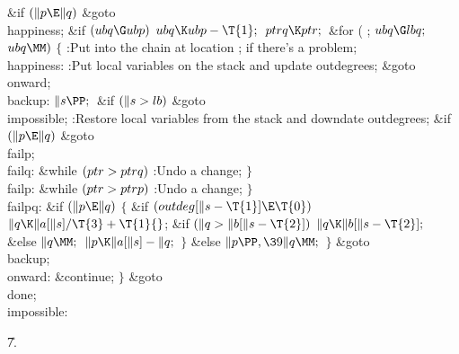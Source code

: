 \&{if} ${}(\|p\E\|q){}$\1\5
\&{goto} \\{happiness};\2\6
\&{if} ${}(\\{ubq}\G\\{ubp}){}$\1\5
${}\\{ubq}\K\\{ubp}-\T{1};{}$\2\6
${}\\{ptrq}\K\\{ptr};{}$\6
\&{for} ( ; ${}\\{ubq}\G\\{lbq};{}$ ${}\\{ubq}\MM){}$\5
${}\{{}$\1\6
:Put  into the chain at location ;  if there's a problem\X;\6
\4\\{happiness}:\5
:Put local variables on the stack and update outdegrees\X;\6
\&{goto} \\{onward};\6
\4\\{backup}:\5
${}\|s\PP;{}$\6
\&{if} ${}(\|s>\\{lb}){}$\1\5
\&{goto} \\{impossible};\2\6
:Restore local variables from the stack and downdate outdegrees\X;\6
\&{if} ${}(\|p\E\|q){}$\1\5
\&{goto} \\{failp};\2\6
\4\\{failq}:\5
\&{while} ${}(\\{ptr}>\\{ptrq}){}$\1\5
:Undo a change\X;\2\6
\4${}\}{}$\2\6
\4\\{failp}:\5
\&{while} ${}(\\{ptr}>\\{ptrp}){}$\1\5
:Undo a change\X;\2\6
\4${}\}{}$\2\6
\4\\{failpq}:\5
\&{if} ${}(\|p\E\|q){}$\5
${}\{{}$\1\6
\&{if} ${}(\\{outdeg}[\|s-\T{1}]\E\T{0}){}$\1\5
${}\|q\K\|a[\|s]/\T{3}+\T{1}{}$;\2\6
\&{if} ${}(\|q>\|b[\|s-\T{2}]){}$\1\5
${}\|q\K\|b[\|s-\T{2}];{}$\2\6
\&{else}\1\5
${}\|q\MM;{}$\2\6
${}\|p\K\|a[\|s]-\|q;{}$\6
\4${}\}{}$\5
\2\&{else}\1\5
${}\|p\PP,\39\|q\MM;{}$\2\6
\4${}\}{}$\2\6
\&{goto} \\{backup};\6
\4\\{onward}:\5
\&{continue};\6
\4${}\}{}$\2\6
\&{goto} \\{done};\6
\4\\{impossible}:\par
\U7.\fi

